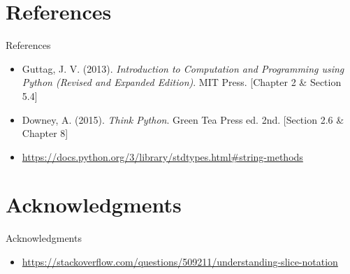 \documentclass[t,handout,9pt]{beamer}
\begin{document}
\section{References}
\begin{frame}{References}
\begin{itemize}
	\item Guttag, J. V. (2013). \textit{Introduction to Computation and Programming using Python (Revised and Expanded Edition)}. MIT Press. [Chapter 2 \& Section 5.4]
	\item Downey, A. (2015). \textit{Think Python}. Green Tea Press ed. 2nd. [Section 2.6 \& Chapter 8]
	\item \url{https://docs.python.org/3/library/stdtypes.html\#string-methods}
\end{itemize}
\end{frame}
\section{Acknowledgments}
\begin{frame}{Acknowledgments}
\begin{itemize}
	\item \url{https://stackoverflow.com/questions/509211/understanding-slice-notation}
\end{itemize}
\end{frame}
%

\end{document}
